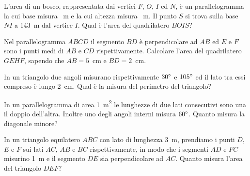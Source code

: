 \begin{multicols}{2}
	\centering

\begin{esercizio}
\label{ese:7.109}
L'area di un bosco, rappresentata dai vertici $F$, $O$, $I$ ed $N$, è un parallelogramma la cui base misura ~m e la cui altezza misura ~m. Il punto $S$ si trova sulla base $NI$ a 143~m dal vertice $I$. Qual è l'area del quadrilatero $BOIS$?
\end{esercizio}

	\centering

\begin{esercizio}
\label{ese:7.110}
Nel parallelogramma $ABCD$ il segmento $BD$ è perpendicolare ad $AB$ ed $E$ e $F$ sono i punti medi di $AB$ e $CD$ rispettivamente. Calcolare l'area del quadrilatero $GEHF$, sapendo che $AB=5$~cm e $BD=2$~cm.
\end{esercizio}

	\centering

\begin{esercizio}
\label{ese:7.111}
In un triangolo due angoli misurano rispettivamente $30{}^{\circ}$ e $105{}^{\circ}$ ed il lato tra essi compreso è lungo 2~cm. Qual è la misura del perimetro del triangolo? 
\end{esercizio}

\begin{esercizio}
\label{ese:7.112}
In un parallelogramma di area 1~m\textsuperscript{2} le lunghezze di due lati consecutivi sono una il doppio dell'altra. Inoltre uno degli angoli interni misura $60{}^{\circ}$. Quanto misura la diagonale minore?
\end{esercizio}

\begin{esercizio}
\label{ese:7.113}
In un triangolo equilatero $ABC$ con lato di lunghezza 3~m, prendiamo i punti $D$, $E$ e $F$ sui lati $AC$, $AB$ e $BC$ rispettivamente, in modo che i segmenti $AD$ e $FC$ misurino 1~m e il segmento $DE$ sia perpendicolare ad $AC$. Quanto misura l'area del triangolo $DEF$?
\end{esercizio}


\end{multicols}
